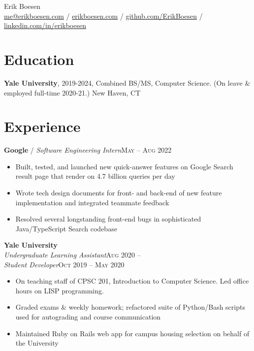 \documentclass[10pt, a4paper]{article}
\begin{document}
{\LARGE Erik Boesen}\\
\href{mailto:me@erikboesen.com}{me@erikboesen.com} / \href{https://erikboesen.com}{erikboesen.com} / \href{https://github.com/ErikBoesen}{github.com/ErikBoesen} / \href{https://www.linkedin.com/in/erikboesen}{linkedin.com/in/erikboesen}\\

\vspace{-7mm}
\section*{Education}
\noindent
\textbf{Yale University}, 2019-2024, Combined BS/MS, Computer Science. (On leave \& employed full-time 2020-21.) New Haven, CT\\

\vspace{-7mm}
\section*{Experience}
\textbf{Google} / \textit{Software Engineering Intern}\hfill \textsc{May -- Aug 2022}\\
\begin{itemize}
    \vspace{-7mm}
    \item Built, tested, and launched new quick-answer features on Google Search result page that render on 4.7 billion queries per day
    \item Wrote tech design documents for front- and back-end of new feature implementation and integrated teammate feedback
    \item Resolved several longstanding front-end bugs in sophisticated Java/TypeScript Search codebase
\end{itemize}

\textbf{Yale University}\\
\textit{Undergraduate Learning Assistant}\hfill \textsc{Aug 2020 --}\\
\textit{Student Developer}\hfill \textsc{Oct 2019 -- May 2020}\\
\begin{itemize}
    \vspace{-7mm}
    \item On teaching staff of CPSC 201, Introduction to Computer Science. Led office hours on LISP programming.
    \item Graded exams \& weekly homework; refactored suite of Python/Bash scripts used for autograding and course communication
    \item Maintained Ruby on Rails web app for campus housing selection on behalf of the University
\end{itemize}
\end{document}
